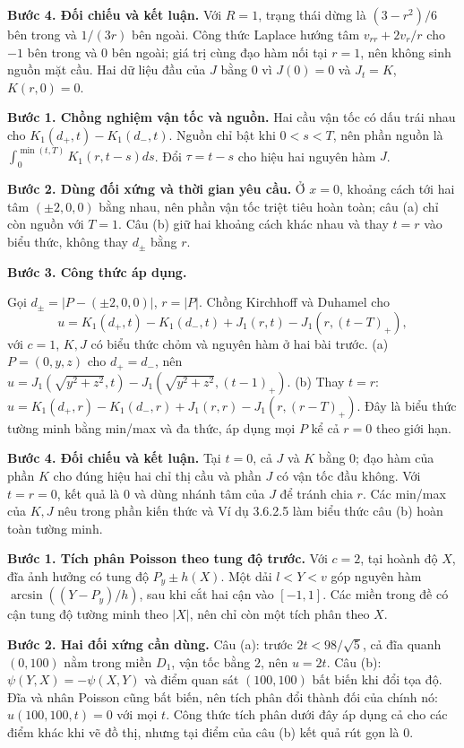 \textbf{Bước 4. Đối chiếu và kết luận.} Với $R=1$, trạng thái dừng là $(3-r^2)/6$ bên trong và $1/(3r)$ bên ngoài. Công thức Laplace hướng tâm $v_{rr}+2v_r/r$ cho $-1$ bên trong và $0$ bên ngoài; giá trị cùng đạo hàm nối tại $r=1$, nên không sinh nguồn mặt cầu. Hai dữ liệu đầu của $J$ bằng $0$ vì $J(0)=0$ và $J_t=K$, $K(r,0)=0$.

\textbf{Bước 1. Chồng nghiệm vận tốc và nguồn.} Hai cầu vận tốc có dấu trái nhau cho $K_1(d_+,t)-K_1(d_-,t)$. Nguồn chỉ bật khi $0<s<T$, nên phần nguồn là $\int_0^{\min(t,T)}K_1(r,t-s)ds$. Đổi $\tau=t-s$ cho hiệu hai nguyên hàm $J$.

\textbf{Bước 2. Dùng đối xứng và thời gian yêu cầu.} Ở $x=0$, khoảng cách tới hai tâm $(\pm2,0,0)$ bằng nhau, nên phần vận tốc triệt tiêu hoàn toàn; câu (a) chỉ còn nguồn với $T=1$. Câu (b) giữ hai khoảng cách khác nhau và thay $t=r$ vào biểu thức, không thay $d_\pm$ bằng $r$.

\textbf{Bước 3. Công thức áp dụng.}

Gọi $d_\pm=|P-(\pm2,0,0)|$, $r=|P|$. Chồng Kirchhoff và Duhamel cho
\[u=K_1(d_+,t)-K_1(d_-,t)+J_1(r,t)-J_1(r,(t-T)_+),\]
với $c=1$, $K,J$ có biểu thức chỏm và nguyên hàm ở hai bài trước.
(a) $P=(0,y,z)$ cho $d_+=d_-$, nên $u=J_1(\sqrt{y^2+z^2},t)-J_1(\sqrt{y^2+z^2},(t-1)_+)$.
(b) Thay $t=r$: $u=K_1(d_+,r)-K_1(d_-,r)+J_1(r,r)-J_1(r,(r-T)_+)$. Đây là biểu thức tường minh bằng min/max và đa thức, áp dụng mọi $P$ kể cả $r=0$ theo giới hạn.

\textbf{Bước 4. Đối chiếu và kết luận.} Tại $t=0$, cả $J$ và $K$ bằng $0$; đạo hàm của phần $K$ cho đúng hiệu hai chỉ thị cầu và phần $J$ có vận tốc đầu không. Với $t=r=0$, kết quả là $0$ và dùng nhánh tâm của $J$ để tránh chia $r$. Các min/max của $K,J$ nêu trong phần kiến thức và Ví dụ 3.6.2.5 làm biểu thức câu (b) hoàn toàn tường minh.

\textbf{Bước 1. Tích phân Poisson theo tung độ trước.} Với $c=2$, tại hoành độ $X$, đĩa ảnh hưởng có tung độ $P_y\pm h(X)$. Một dải $l<Y<v$ góp nguyên hàm $\arcsin((Y-P_y)/h)$, sau khi cắt hai cận vào $[-1,1]$. Các miền trong đề có cận tung độ tường minh theo $|X|$, nên chỉ còn một tích phân theo $X$.

\textbf{Bước 2. Hai đối xứng cần dùng.} Câu (a): trước $2t<98/\sqrt5$, cả đĩa quanh $(0,100)$ nằm trong miền $D_1$, vận tốc bằng $2$, nên $u=2t$. Câu (b): $\psi(Y,X)=-\psi(X,Y)$ và điểm quan sát $(100,100)$ bất biến khi đổi tọa độ. Đĩa và nhân Poisson cũng bất biến, nên tích phân đổi thành đối của chính nó: $u(100,100,t)=0$ với mọi $t$. Công thức tích phân dưới đây áp dụng cả cho các điểm khác khi vẽ đồ thị, nhưng tại điểm của câu (b) kết quả rút gọn là $0$.

